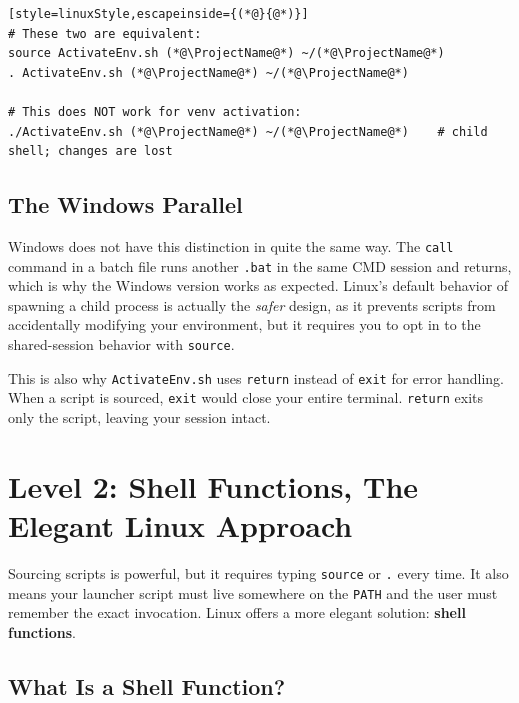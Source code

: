 \begin{lstlisting}[style=linuxStyle,escapeinside={(*@}{@*)}]
# These two are equivalent:
source ActivateEnv.sh (*@\ProjectName@*) ~/(*@\ProjectName@*)
. ActivateEnv.sh (*@\ProjectName@*) ~/(*@\ProjectName@*)

# This does NOT work for venv activation:
./ActivateEnv.sh (*@\ProjectName@*) ~/(*@\ProjectName@*)    # child shell; changes are lost
\end{lstlisting}

\subsection{The Windows Parallel}

Windows does not have this distinction in quite the same way. The
\texttt{call} command in a batch file runs another \texttt{.bat} in the
same CMD session and returns, which is why the Windows version works
as expected. Linux's default behavior of spawning a child process is
actually the \emph{safer} design, as it prevents scripts from accidentally
modifying your environment, but it requires you to opt in to the
shared-session behavior with \texttt{source}.

\begin{notebox}
This is also why \texttt{ActivateEnv.sh} uses \texttt{return} instead of
\texttt{exit} for error handling. When a script is sourced, \texttt{exit}
would close your entire terminal. \texttt{return} exits only the script,
leaving your session intact.
\end{notebox}

\section{Level 2: Shell Functions, The Elegant Linux Approach}
\label{sec:level2}

Sourcing scripts is powerful, but it requires typing \texttt{source}
or \texttt{.} every time. It also means your launcher script must live
somewhere on the \texttt{PATH} and the user must remember the exact
invocation. Linux offers a more elegant solution: \textbf{shell functions}.

\subsection{What Is a Shell Function?}

